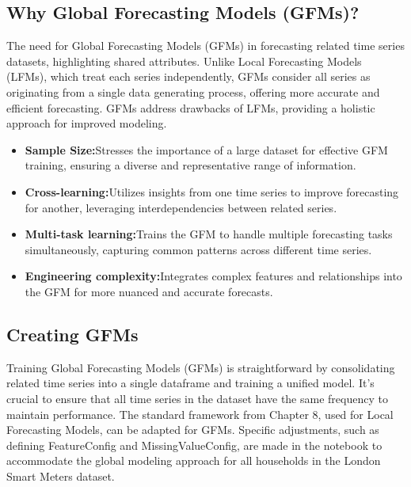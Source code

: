 \documentclass{article}
\begin{document}
\subsection{Why Global Forecasting Models (GFMs)?}
The need for Global Forecasting Models (GFMs) in forecasting related time series datasets, highlighting shared attributes. Unlike Local Forecasting Models (LFMs), which treat each series independently, GFMs consider all series as originating from a single data generating process, offering more accurate and efficient forecasting. GFMs address drawbacks of LFMs, providing a holistic approach for improved modeling.
\begin{itemize}
     \item \textbf{Sample Size:}Stresses the importance of a large dataset for effective GFM training, ensuring a diverse and representative range of information.
     \item \textbf{Cross-learning:}Utilizes insights from one time series to improve forecasting for another, leveraging interdependencies between related series.
     \item \textbf{Multi-task learning:}Trains the GFM to handle multiple forecasting tasks simultaneously, capturing common patterns across different time series.
     \item \textbf{Engineering complexity:}Integrates complex features and relationships into the GFM for more nuanced and accurate forecasts.
\end{itemize}

\subsection{Creating GFMs}
Training Global Forecasting Models (GFMs) is straightforward by consolidating related time series into a single dataframe and training a unified model. It's crucial to ensure that all time series in the dataset have the same frequency to maintain performance. The standard framework from Chapter 8, used for Local Forecasting Models, can be adapted for GFMs. Specific adjustments, such as defining FeatureConfig and MissingValueConfig, are made in the notebook to accommodate the global modeling approach for all households in the London Smart Meters dataset.
\end{document}
